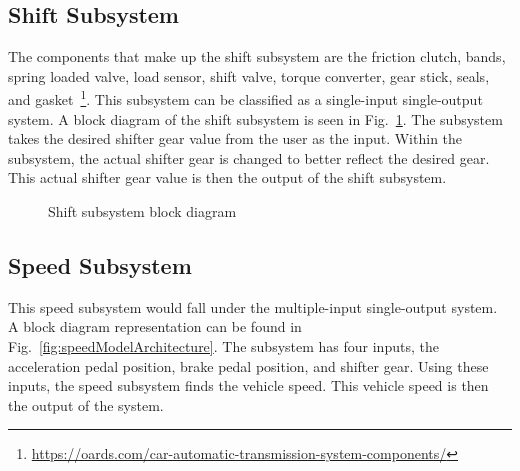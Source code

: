 \documentclass[conference]{IEEEtran}
\begin{document}
  \subsection{Shift Subsystem}
 The components that make up the shift subsystem are the friction clutch, bands, spring loaded valve, load sensor, shift valve, torque converter, gear stick, seals, and gasket~\footnote{\url{https://oards.com/car-automatic-transmission-system-components/}}. This subsystem can be classified as a single-input single-output system. A block diagram of the shift subsystem is seen in Fig.~\ref{fig:shiftModelArchitecture}. The subsystem takes the desired shifter gear value from the user as the input. Within the subsystem, the actual shifter gear is changed to better reflect the desired gear. This actual shifter gear value is then the output of the shift subsystem.
 \begin{figure}[htbp]
    \centering
    \caption{Shift subsystem block diagram}
    \label{fig:shiftModelArchitecture}
 \end{figure}

  \subsection{Speed Subsystem}
This speed subsystem would fall under the multiple-input single-output system. A block diagram representation can be found in Fig.~\ref{fig:speedModelArchitecture}. The subsystem has four inputs, the acceleration pedal position, brake pedal position, and shifter gear. Using these inputs, the speed subsystem finds the vehicle speed. This vehicle speed is then the output of the system.
\end{document}

